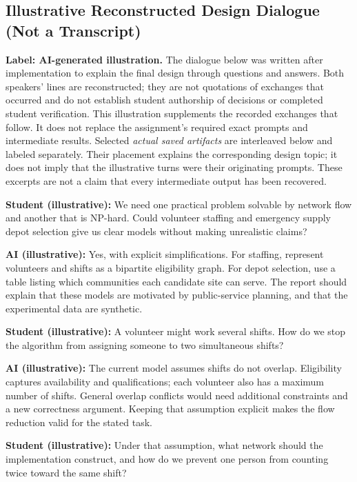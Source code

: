 \subsection{Illustrative Reconstructed Design Dialogue (Not a Transcript)}
\label{app:reconstructed}
\noindent\textbf{Label: AI-generated illustration.}
The dialogue below was written after implementation to explain the final
design through questions and answers. Both speakers' lines are reconstructed;
they are not quotations of exchanges that occurred and do not establish
student authorship of decisions or completed student verification. This
illustration supplements the recorded exchanges that follow. It does not
replace the assignment's required exact prompts and intermediate results.
Selected \emph{actual saved artifacts} are interleaved below and labeled
separately. Their placement explains the corresponding design topic; it does
not imply that the illustrative turns were their originating prompts. These
excerpts are not a claim that every intermediate output has been recovered.

\providecommand{\designturn}[2]{\par\medskip\noindent\textbf{#1 (illustrative):} #2\par}

\designturn{Student}{We need one practical problem solvable by network flow
and another that is NP-hard. Could volunteer staffing and emergency supply
depot selection give us clear models without making unrealistic claims?}

\designturn{AI}{Yes, with explicit simplifications. For staffing, represent
volunteers and shifts as a bipartite eligibility graph. For depot selection,
use a table listing which communities each candidate site can serve. The
report should explain that these models are motivated by public-service
planning, and that the experimental data are synthetic.}

\designturn{Student}{A volunteer might work several shifts. How do we stop
the algorithm from assigning someone to two simultaneous shifts?}

\designturn{AI}{The current model assumes shifts do not overlap. Eligibility
captures availability and qualifications; each volunteer also has a maximum
number of shifts. General overlap conflicts would need additional constraints
and a new correctness argument. Keeping that assumption explicit makes the
flow reduction valid for the stated task.}

\designturn{Student}{Under that assumption, what network should the
implementation construct, and how do we prevent one person from counting
twice toward the same shift?}

